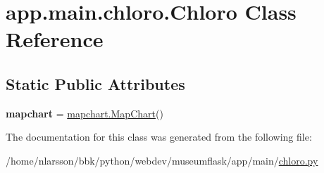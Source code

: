 \hypertarget{classapp_1_1main_1_1chloro_1_1Chloro}{}\section{app.\+main.\+chloro.\+Chloro Class Reference}
\label{classapp_1_1main_1_1chloro_1_1Chloro}
\subsection*{Static Public Attributes}
\begin{DoxyCompactItemize}
\item 
\mbox{\label{classapp_1_1main_1_1chloro_1_1Chloro_a895a373a54e52b3ebdcfd70ac36a5b17}} 
{\bfseries mapchart} = \mbox{\hyperlink{classapp_1_1main_1_1mapchart_1_1MapChart}{mapchart.\+Map\+Chart}}()
\end{DoxyCompactItemize}


The documentation for this class was generated from the following file\+:\begin{DoxyCompactItemize}
\item 
/home/nlarsson/bbk/python/webdev/museumflask/app/main/\mbox{\hyperlink{chloro_8py}{chloro.\+py}}\end{DoxyCompactItemize}
